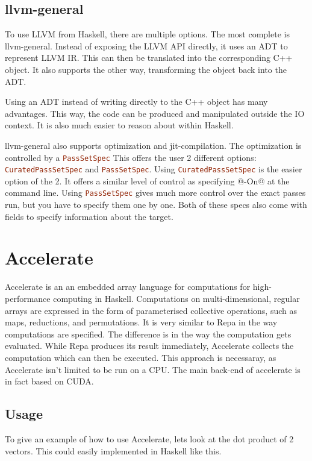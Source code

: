 \documentclass[a4paper,bibliography=totocnumbered,parskip,headsepline]{scrbook}
\begin{document}
\subsection{llvm-general}
To use LLVM from Haskell, there are multiple options.
The most complete is llvm-general.\cite{scarlet2013llvm}
Instead of exposing the LLVM API directly, it uses an ADT to represent LLVM IR.
This can then be translated into the corresponding C++ object.
It also supports the other way, transforming the object back into the ADT.

Using an ADT instead of writing directly to the C++ object has many advantages.
This way, the code can be produced and manipulated outside the IO context.
It is also much easier to reason about within Haskell.

llvm-general also supports optimization and jit-compilation.
The optimization is controlled by a \lstinline[language=haskell]!PassSetSpec!
This offers the user 2 different options: \lstinline[language=haskell]!CuratedPassSetSpec! and \lstinline[language=haskell]!PassSetSpec!.
Using \lstinline[language=haskell]!CuratedPassSetSpec! is the easier option of the 2.
It offers a similar level of control as specifying @-On@ at the command line.
Using \lstinline[language=haskell]!PassSetSpec! gives much more control over the exact passes run, but you have to specify them one by one.
Both of these specs also come with fields to specify information about the target.

\section{Accelerate}
Accelerate\cite{chakravarty2011accelerating,mcdonelloptimising} is an an embedded array language for computations for high-performance computing in Haskell.
Computations on multi-dimensional, regular arrays are expressed in the form of parameterised collective operations, such as maps, reductions, and permutations.
It is very similar to Repa\cite{keller2010regular} in the way computations are specified.
The difference is in the way the computation gets evaluated.
While Repa produces its result immediately, Accelerate collects the computation which can then be executed.
This approach is necessaray, as Accelerate isn't limited to be run on a CPU.
The main back-end of accelerate is in fact based on CUDA.

\subsection{Usage}
To give an example of how to use Accelerate, lets look at the dot product of 2 vectors.
This could easily implemented in Haskell like this.
\end{document}
